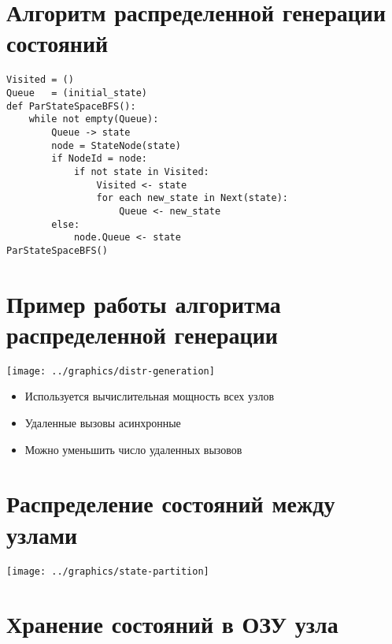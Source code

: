 \documentclass[12pt]{article}
\begin{document}
\section{Алгоритм распределенной генерации состояний}
\label{sec:distr-generation}

\begin{lstlisting}[style=pseudocode]
Visited = ()
Queue   = (initial_state)
def ParStateSpaceBFS():
    while not empty(Queue):
        Queue -> state
        node = StateNode(state)
        if NodeId = node:
            if not state in Visited:
                Visited <- state
                for each new_state in Next(state):
                    Queue <- new_state
        else:
            node.Queue <- state
ParStateSpaceBFS()
\end{lstlisting}

\section{Пример работы алгоритма распределенной генерации}
\label{sec:distr-generation2}

\begin{minipage}[m]{0.55\linewidth}
  \texttt{[image: ../graphics/distr-generation]}
\end{minipage}
\begin{minipage}[m]{0.45\linewidth}
  \begin{flushleft}
    \begin{itemize}
    \item Используется вычислительная мощность всех узлов
    \item Удаленные вызовы асинхронные
    \item Можно уменьшить число удаленных вызовов
    \end{itemize}
  \end{flushleft}
\end{minipage}

\section{Распределение состояний между узлами}
\label{sec:state-partitioning}

\begin{center}
  \texttt{[image: ../graphics/state-partition]}
\end{center}

\section{Хранение состояний в ОЗУ узла}
\label{sec:state-store-full}
\end{document}
